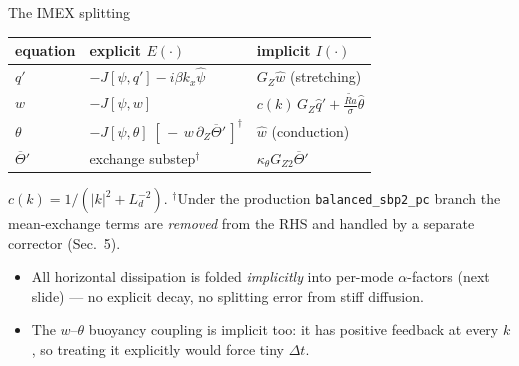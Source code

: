 \documentclass[aspectratio=169,10pt]{beamer}
\newcommand{\Rat}{\widetilde{Ra}}
\newcommand{\Ld}{L_d}
\newcommand{\Jac}[2]{J\!\left[#1,#2\right]}
\newcommand{\Tb}{\overline{\Theta}}
\newcommand{\dZ}{\partial_Z}
\begin{document}
\begin{frame}{The IMEX splitting}
  \begin{center}
  \small
  \begin{tabular}{@{}lll@{}}
    \toprule
    equation & \textbf{explicit} $E(\cdot)$ & \textbf{implicit} $I(\cdot)$ \\
    \midrule
    $q'$ & $-\Jac{\psi}{q'} - i\beta k_x\hat\psi$ & $G_Z \hat w$ \quad (stretching) \\
    $w$ & $-\Jac{\psi}{w}$ & $c(k)\, G_Z \hat q' + \tfrac{\Rat}{\sigma}\hat\theta$ \\
    $\theta$ & $-\Jac{\psi}{\theta}\;[\,-\,w\,\dZ\Tb'\,]^{\dagger}$ & $\hat w$ \quad (conduction) \\
    $\Tb'$ & exchange substep$^{\dagger}$ & $\kappa_\theta G_{Z2}\Tb'$ \\
    \bottomrule
  \end{tabular}
  \end{center}
  {\footnotesize $c(k) = 1/(|k|^2+\Ld^{-2})$. $^{\dagger}$Under the production
  \texttt{balanced\_sbp2\_pc} branch the mean-exchange terms are \emph{removed} from the
  RHS and handled by a separate corrector (Sec.~5).}
  \begin{itemize}
    \item All horizontal dissipation is folded \emph{implicitly} into per-mode
      $\alpha$-factors (next slide) --- no explicit decay, no splitting error from
      stiff diffusion.
    \item The $w$--$\theta$ buoyancy coupling is implicit too: it has positive
      feedback at every $k$, so treating it explicitly would force tiny $\Delta t$.
  \end{itemize}
\end{frame}
\end{document}
